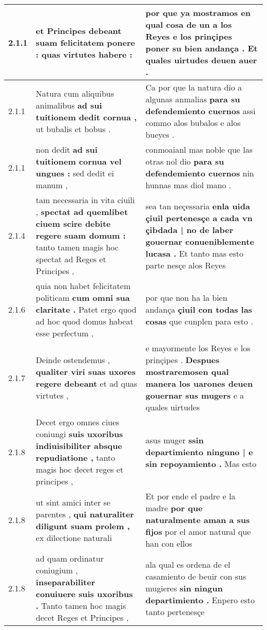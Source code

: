 \begin{tabular}{|p{1cm}|p{6.5cm}|p{6.5cm}|}
2.1.1 & et Principes debeant \textbf{ suam felicitatem ponere : } quas virtutes habere : & por que ya mostramos en qual cosa de un a los Reyes \textbf{ e los prinçipes poner su bien andança . } Et quales uirtudes deuen auer . \\\hline
2.1.1 & Natura cum aliquibus animalibus \textbf{ ad sui tuitionem dedit cornua , } ut bubalis et bobus . & Ca por que la natura dio a algunas anmalias \textbf{ para su defendemiento cuernos } assi commo alos bubalos e alos bueyes . \\\hline
2.1.1 & non dedit \textbf{ ad sui tuitionem cornua vel ungues : } sed dedit ei manum , & conmoaianl mas noble que las otras nol dio \textbf{ para su defendemiento cuernos } nin hunnas mas diol mano . \\\hline
2.1.4 & tam necessaria in vita ciuili , \textbf{ spectat ad quemlibet ciuem scire debite regere suam domum : } tanto tamen magis hoc spectat ad Reges et Principes , & sea tan neçessaria \textbf{ enla uida çiuil pertenesçe a cada vn çibdada | no de laber gouernar conueniblemente lucasa . } Et tanto mas esto parte nesçe alos Reyes \\\hline
2.1.6 & quia non habet felicitatem politicam \textbf{ cum omni sua claritate . } Patet ergo quod ad hoc quod domus habeat esse perfectum , & por que non ha la bien andança \textbf{ çiuil con todas las cosas } que cunplen para esto . \\\hline
2.1.7 & Deinde ostendemus , \textbf{ qualiter viri suas uxores regere debeant } et ad quas virtutes , & e mayormente los Reyes e los prinçipes . \textbf{ Despues mostraremosen qual manera los uarones deuen gouernar sus mugers } e a quales uirtudes \\\hline
2.1.8 & Decet ergo omnes ciues coniungi \textbf{ suis uxoribus indiuisibiliter absque repudiatione , } tanto magis hoc decet reges et principes , & asus muger \textbf{ ssin departimiento ninguno | e sin repoyamiento . } Mas esto \\\hline
2.1.8 & ut sint amici inter se parentes , \textbf{ qui naturaliter diligunt suam prolem , } ex dilectione naturali & Et por ende el padre e la madre \textbf{ por que naturalmente aman a sus fijos } por el amor natural que han con ellos \\\hline
2.1.8 & ad quam ordinatur coniugium , \textbf{ inseparabiliter conuiuere suis uxoribus . } Tanto tamen hoc magis decet Reges et Principes , & ala qual es ordena de el casamiento de beuir con sus mugieres \textbf{ sin ningun departimiento . } Enpero esto tanto pertenesçe \\\hline

\end{tabular}
